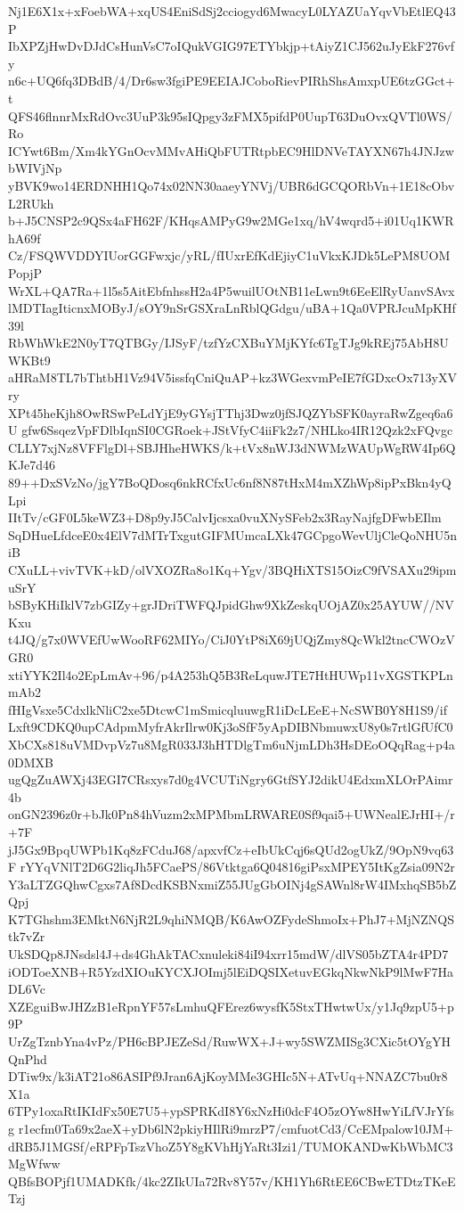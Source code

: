 Nj1E6X1x+xFoebWA+xqUS4EniSdSj2cciogyd6MwacyL0LYAZUaYqvVbEtlEQ43P
IbXPZjHwDvDJdCsHunVsC7oIQukVGIG97ETYbkjp+tAiyZ1CJ562uJyEkF276vfy
n6c+UQ6fq3DBdB/4/Dr6sw3fgiPE9EEIAJCoboRievPIRhShsAmxpUE6tzGGct+t
QFS46flnnrMxRdOvc3UuP3k95sIQpgy3zFMX5pifdP0UupT63DuOvxQVTl0WS/Ro
ICYwt6Bm/Xm4kYGnOcvMMvAHiQbFUTRtpbEC9HlDNVeTAYXN67h4JNJzwbWIVjNp
yBVK9wo14ERDNHH1Qo74x02NN30aaeyYNVj/UBR6dGCQORbVn+1E18cObvL2RUkh
b+J5CNSP2c9QSx4aFH62F/KHqsAMPyG9w2MGe1xq/hV4wqrd5+i01Uq1KWRhA69f
Cz/FSQWVDDYIUorGGFwxjc/yRL/fIUxrEfKdEjiyC1uVkxKJDk5LePM8UOMPopjP
WrXL+QA7Ra+1l5s5AitEbfnhssH2a4P5wuilUOtNB11eLwn9t6EeElRyUanvSAvx
lMDTIagIticnxMOByJ/sOY9nSrGSXraLnRblQGdgu/uBA+1Qa0VPRJcuMpKHf39l
RbWhWkE2N0yT7QTBGy/IJSyF/tzfYzCXBuYMjKYfc6TgTJg9kREj75AbH8UWKBt9
aHRaM8TL7bThtbH1Vz94V5issfqCniQuAP+kz3WGexvmPeIE7fGDxcOx713yXVry
XPt45heKjh8OwRSwPeLdYjE9yGYsjTThj3Dwz0jfSJQZYbSFK0ayraRwZgeq6a6U
gfw6SsqezVpFDlbIqnSI0CGRoek+JStVfyC4iiFk2z7/NHLko4IR12Qzk2xFQvgc
CLLY7xjNz8VFFlgDl+SBJHheHWKS/k+tVx8nWJ3dNWMzWAUpWgRW4Ip6QKJe7d46
89++DxSVzNo/jgY7BoQDosq6nkRCfxUc6nf8N87tHxM4mXZhWp8ipPxBkn4yQLpi
IItTv/cGF0L5keWZ3+D8p9yJ5CalvIjcsxa0vuXNySFeb2x3RayNajfgDFwbEIlm
SqDHueLfdceE0x4ElV7dMTrTxgutGIFMUmcaLXk47GCpgoWevUljCleQoNHU5niB
CXuLL+vivTVK+kD/olVXOZRa8o1Kq+Ygv/3BQHiXTS15OizC9fVSAXu29ipmuSrY
bSByKHiIklV7zbGIZy+grJDriTWFQJpidGhw9XkZeskqUOjAZ0x25AYUW//NVKxu
t4JQ/g7x0WVEfUwWooRF62MIYo/CiJ0YtP8iX69jUQjZmy8QcWkl2tncCWOzVGR0
xtiYYK2Il4o2EpLmAv+96/p4A253hQ5B3ReLquwJTE7HtHUWp11vXGSTKPLnmAb2
fHIgVsxe5CdxlkNliC2xe5DtcwC1mSmicqluuwgR1iDcLEeE+NcSWB0Y8H1S9/if
Lxft9CDKQ0upCAdpmMyfrAkrIlrw0Kj3oSfF5yApDIBNbmuwxU8y0s7rtlGfUfC0
XbCXs818uVMDvpVz7u8MgR033J3hHTDlgTm6uNjmLDh3HsDEoOQqRag+p4a0DMXB
ugQgZuAWXj43EGI7CRsxys7d0g4VCUTiNgry6GtfSYJ2dikU4EdxmXLOrPAimr4b
onGN2396z0r+bJk0Pn84hVuzm2xMPMbmLRWARE0Sf9qai5+UWNealEJrHI+/r+7F
jJ5Gx9BpqUWPb1Kq8zFCduJ68/apxvfCz+eIbUkCqj6sQUd2ogUkZ/9OpN9vq63F
rYYqVNlT2D6G2liqJh5FCaePS/86Vtktga6Q04816giPsxMPEY5ItKgZsia09N2r
Y3aLTZGQhwCgxs7Af8DcdKSBNxmiZ55JUgGbOINj4gSAWnl8rW4IMxhqSB5bZQpj
K7TGhshm3EMktN6NjR2L9qhiNMQB/K6AwOZFydeShmoIx+PhJ7+MjNZNQStk7vZr
UkSDQp8JNsdsl4J+ds4GhAkTACxnuleki84iI94xrr15mdW/dlVS05bZTA4r4PD7
iODToeXNB+R5YzdXIOuKYCXJOImj5lEiDQSIXetuvEGkqNkwNkP9lMwF7HaDL6Vc
XZEguiBwJHZzB1eRpnYF57sLmhuQFErez6wysfK5StxTHwtwUx/y1Jq9zpU5+p9P
UrZgTznbYna4vPz/PH6cBPJEZeSd/RuwWX+J+wy5SWZMISg3CXic5tOYgYHQnPhd
DTiw9x/k3iAT21o86ASIPf9Jran6AjKoyMMe3GHIc5N+ATvUq+NNAZC7bu0r8X1a
6TPy1oxaRtIKIdFx50E7U5+ypSPRKdI8Y6xNzHi0dcF4O5zOYw8HwYiLfVJrYfsg
r1ecfm0Ta69x2aeX+yDb6lN2pkiyHIlRi9mrzP7/cmfuotCd3/CcEMpalow10JM+
dRB5J1MGSf/eRPFpTszVhoZ5Y8gKVhHjYaRt3Izi1/TUMOKANDwKbWbMC3MgWfww
QBfsBOPjf1UMADKfk/4kc2ZIkUIa72Rv8Y57v/KH1Yh6RtEE6CBwETDtzTKeETzj
